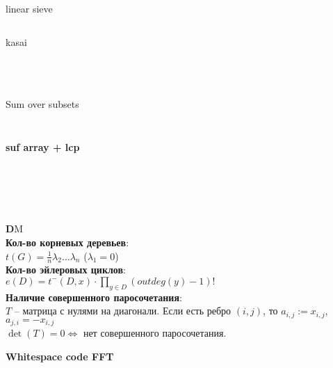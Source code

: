 \documentclass[a4paper,12pt, twocolumn]{article}
\begin{document}
\pagebreak
\inputminted[linenos, breaklines]{c++}{code/sk.cpp} \pagebreak
\inputminted[linenos, breaklines]{c++}{code/convex_hull_trick.cpp} \pagebreak
\inputminted[linenos, breaklines]{c++}{code/automaton2.cpp} \pagebreak
\inputminted[linenos, breaklines]{c++}{code/discrete_log.cpp} \pagebreak
\inputminted[linenos, breaklines]{c++}{code/euclid.cpp} 
linear sieve\\
\inputminted[linenos, breaklines]{c++}{code/sieve.cpp} 
kasai\\
\inputminted[linenos, breaklines]{c++}{code/hungarian.cpp} \pagebreak
\inputminted[linenos, breaklines]{c++}{code/max_flow.cpp} \pagebreak
\inputminted[linenos, breaklines]{c++}{code/min_cost.cpp} \pagebreak
\inputminted[linenos, breaklines]{c++}{code/min_cyclic_shift.cpp}
Sum over subsets\\
\inputminted[linenos, breaklines]{c++}{code/sum_over_subsets.cpp}
 \pagebreak
\inputminted[linenos, breaklines]{c++}{code/strings.cpp} \pagebreak
\textbf{suf array + lcp}
\inputminted[linenos, breaklines]{c++}{code/suffmas.cpp} \pagebreak

\inputminted[linenos, breaklines]{c++}{code/prime_roots.cpp} \pagebreak

\inputminted[linenos, breaklines]{c++}{code/fft.cpp}
\inputminted[linenos, breaklines]{c++}{code/fft_and_ds.cpp}
\pagebreak
\inputminted[linenos,breaklines]{c++}{code/min_circulation.cpp}\pagebreak
\inputminted[linenos, breaklines]{c++}{code/min_mean_cycle.cpp}
\pagebreak
{\textbf DM}\\

{\bf Кол-во корневых деревьев}:\\
$t(G)=\frac 1 n \lambda_2 \ldots \lambda_n$ ($\lambda_1=0$)\\

{\bf Кол-во эйлеровых циклов}:\\
$e(D)=t^-(D,x) \cdot \prod\limits_{y\in D} (outdeg(y)-1)!$\\

{\bf Наличие совершенного паросочетания}:\\
$T$ -- матрица с нулями на диагонали. Если есть ребро $(i, j)$, то $a_{i,j}:=x_{i,j}$, $a_{j,i}=-x_{i,j}$\\
$\det(T)=0 \Leftrightarrow$ нет совершенного паросочетания.
\pagebreak

{\bf \Large Whitespace code FFT} \pagebreak
\end{document}
